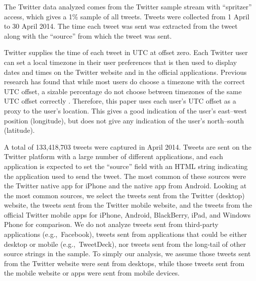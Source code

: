 \documentclass{sigchi}
\newcommand{\eg}{e.g.,~\ignorespaces}
\begin{document}
The Twitter data analyzed comes from the Twitter sample stream with ``spritzer'' access, which gives a 1\% sample of all tweets. Tweets were collected from 1 April to 30 April 2014. The time each tweet was sent was extracted from the tweet along with the ``source'' from which the tweet was sent.

Twitter supplies the time of each tweet in UTC at offset zero. Each Twitter user can set a local timezone in their user preferences that is then used to display dates and times on the Twitter website and in the official applications. Previous research has found that while most users do choose a timezone with the correct UTC offset, a sizable percentage do not choose between timezones of the same UTC offset correctly \cite{graham2014-twitter}. Therefore, this paper uses each user's UTC offset as a proxy to the user's location. This gives a good indication of the user's east--west position (longitude), but does not give any indication of the user's north--south (latitude).

A total of 133,418,703 tweets were captured in April 2014. Tweets are sent on the Twitter platform with a large number of different applications, and each application is expected to set the ``source'' field with an HTML string indicating the application used to send the tweet. The most common of these sources were the Twitter native app for iPhone and the native app from Android. Looking at the most common sources, we select the tweets sent from the Twitter (desktop) website, the tweets sent from the Twitter mobile website, and the tweets from the official Twitter mobile apps for iPhone, Android, BlackBerry, iPad, and Windows Phone for comparison.
We do not analyze tweets sent from third-party applications (\eg Facebook), tweets sent from applications that could be either desktop or mobile (\eg TweetDeck), nor tweets sent from the long-tail of other source strings in the sample. To simply our analysis, we assume those tweets sent from the Twitter website were sent from desktops, while those tweets sent from the mobile website or apps were sent from mobile devices.
\end{document}
